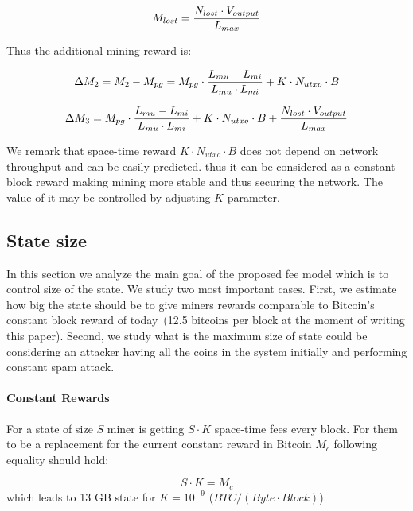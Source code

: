 \documentclass[]{llncs}   %
\begin{document}
\begin{equation}
M_{lost} = {N_{lost} \cdot V_{output} \over L_{max}}
\end{equation}

Thus the additional mining reward is:

\begin{equation}
\Delta M_2 = M_2 - M_{pg} = M_{pg} \cdot {{L_{mu}-L_{mi}} \over {L_{mu} \cdot L_{mi}}} + K \cdot N_{utxo} \cdot B
\end{equation}

\begin{equation}
\Delta M_3 = M_{pg} \cdot {{L_{mu}-L_{mi}} \over {L_{mu} \cdot L_{mi}}} + K \cdot N_{utxo} \cdot B + {N_{lost} \cdot V_{output} \over L_{max}}
\end{equation}

We remark that space-time reward $K \cdot N_{utxo} \cdot B$ does not depend on network throughput and can be easily predicted. thus it can be considered as a constant block reward making mining more stable and thus securing the network. The value of it may be controlled by adjusting $K$ parameter.

\subsection{State size}

In this section we analyze the main goal of the proposed fee model which is to control size of the state. We study two most important cases. First, we estimate how big the state should be to give miners rewards comparable to Bitcoin's constant block reward of today~(12.5 bitcoins per block at the moment of writing this paper). Second, we study what is the maximum size of state could be considering an attacker having all the coins in the system initially and performing constant spam attack.

\paragraph{Constant Rewards}

For a state of size $S$ miner is getting $S \cdot K$ space-time fees every block. For them to be a replacement for the current constant reward in Bitcoin $M_c$ following equality should hold:

\begin{equation}
\label{eq:statesizeexp}
S \cdot K = M_c
\end{equation}
which leads to 13 GB state for $K=10^{-9}$ ($BTC / (Byte \cdot Block)$).
\end{document}
